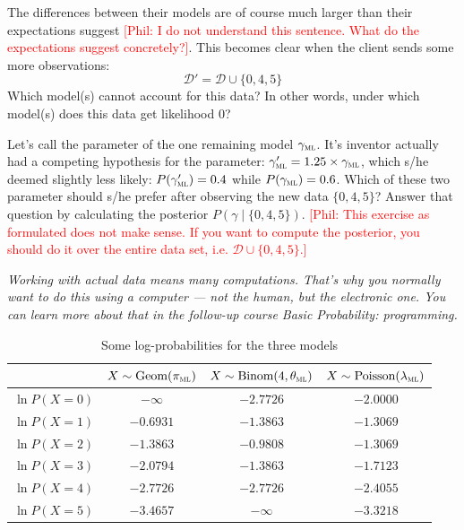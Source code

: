 \documentclass[a4paper,10pt,landscape,twocolumn]{scrartcl}
\newcommand{\philip}[1]{\textcolor{red}{[Phil: #1]}}
\begin{document}
\begin{exercise}
	\begin{subex}[0.5pt]
		The differences between their models are of course much larger than their expectations suggest \philip{I do not understand this sentence. What do the expectations suggest concretely?}. This becomes clear when the client sends some more observations:
		\[
			\mathcal D' = \mathcal D \cup \{ 0, 4, 5 \}
		\]
		Which model(s) cannot account for this data? In other words, under which model(s) does this data get likelihood 0?
	\end{subex}
	
	\begin{subex}[1pt]
	Let's call the parameter of the one remaining model	$\gamma_\textsc{ml}$. It's inventor actually had a competing hypothesis for the parameter: $\gamma_\textsc{ml}' = 1.25 \times \gamma_\textsc{ml}$, which s/he deemed slightly less likely: $P(\gamma_\textsc{ml}') = 0.4$ while $P(\gamma_\textsc{ml}) = 0.6$. Which of these two parameter should s/he prefer after observing the new data $\{ 0, 4, 5 \}$? Answer that question by calculating the posterior $P(\gamma \mid \{0, 4, 5\})$. \philip{This exercise
	as formulated does not make sense. If you want to compute the posterior, you should do it over the entire data set, i.e. $ \mathcal D \cup \{ 0, 4, 5 \} $.}
	\end{subex}
	
	\bigbreak\noindent
	\emph{Working with actual data means many computations. That's why you normally want to do this using a computer --- not the human, but the electronic one. You can learn more about that in the follow-up course \emph{Basic Probability: programming}.}
\end{exercise}

\begin{table}
\begin{tabular}{l c c c}
& 	$X \sim \text{Geom}(\pi_\textsc{ml})$
&	$X \sim \text{Binom}(4, \theta_\textsc{ml})$
&	$X \sim \text{Poisson}(\lambda_\textsc{ml})$ \\\hline\hline
$\ln P(X = 0)$ &$-\infty$ &$-2.7726$ &$-2.0000$ \\\hline
$\ln P(X = 1)$ &$-0.6931$ &$-1.3863$ &$-1.3069$ \\\hline
$\ln P(X = 2)$ &$-1.3863$ &$-0.9808$ &$-1.3069$ \\\hline
$\ln P(X = 3)$ &$-2.0794$ &$-1.3863$ &$-1.7123$ \\\hline
$\ln P(X = 4)$ &$-2.7726$ &$-2.7726$ &$-2.4055$ \\\hline
$\ln P(X = 5)$ &$-3.4657$ &$-\infty$ &$-3.3218$ \\\hline
\end{tabular}
\caption{Some log-probabilities for the three models \label{table}}
\end{table}
\end{document}
